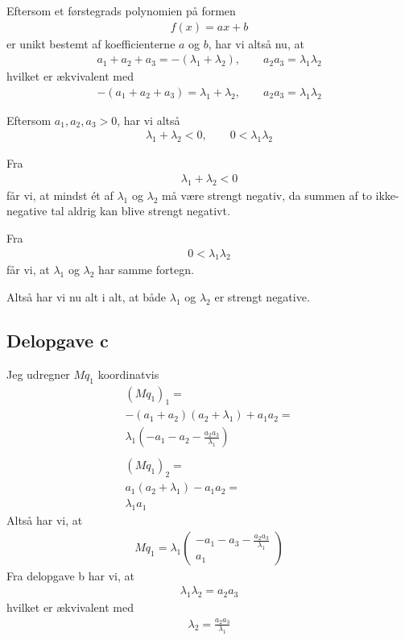\documentclass[12pt]{article}
\begin{document}
Eftersom et førstegrads polynomien på formen 
\begin{align}
f(x) = ax + b
\end{align}
er unikt bestemt af koefficienterne $a$ og $b$, har vi altså nu, at
\begin{align}
a_1 + a_2 + a_3 = -(\lambda_1 + \lambda_2), \qquad a_2a_3 = \lambda_1\lambda_2
\end{align}
hvilket er ækvivalent med
\begin{align}
-(a_1 + a_2 + a_3) = \lambda_1 + \lambda_2, \qquad a_2a_3 = \lambda_1\lambda_2
\end{align}

Eftersom $a_1, a_2, a_3>0$, har vi altså
\begin{align}
\lambda_1 + \lambda_2 < 0, \qquad 0 < \lambda_1\lambda_2
\end{align}

Fra 
\begin{align}
\lambda_1 + \lambda_2 < 0
\end{align}
får vi, at mindst ét af $\lambda_1$ og $\lambda_2$ må være strengt negativ, da summen af to ikke-negative tal aldrig kan blive strengt negativt. 

Fra
\begin{align}
0 < \lambda_1\lambda_2
\end{align}
får vi, at $\lambda_1$ og $\lambda_2$ har samme fortegn. 

Altså har vi nu alt i alt, at både $\lambda_1$ og $\lambda_2$ er strengt negative.

\subsection{Delopgave c}

Jeg udregner $Mq_1$ koordinatvis
\begin{align}
(Mq_1)_1 = \\ 
-(a_1 + a_2)(a_2 + \lambda_1) + a_1a_2 = \\
\lambda_1(-a_1 - a_2 - \frac{a_2a_3}{\lambda_1})\\ \\
(Mq_1)_2 = \\ 
a_1(a_2 + \lambda_1) - a_1a_2 = \\
\lambda_1a_1
\end{align}
Altså har vi, at 
\begin{align}
Mq_1 = \lambda_1 \begin{pmatrix}
-a_1 - a_3 - \frac{a_2a_3}{\lambda_1}\\
a_1
\end{pmatrix}
\end{align}
Fra delopgave b har vi, at
\begin{align}
\lambda_1\lambda_2 = a_2a_3
\end{align}
hvilket er ækvivalent med
\begin{align}
\lambda_2 = \frac{a_2a_3}{\lambda_1}
\end{align}
\end{document}
